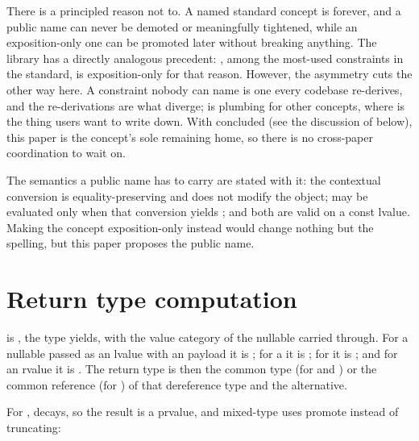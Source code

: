 \documentclass[a4paper,10pt,oneside,openany,final,article]{memoir}
\begin{document}
There is a principled reason not to. A named standard concept is forever, and
a public name can never be demoted or meaningfully tightened, while an
exposition-only one can be promoted later without breaking anything. The
library has a directly analogous precedent: ,
among the most-used constraints in the standard, is exposition-only for that
reason. However, the asymmetry cuts the other way here. A
constraint nobody can name is one every codebase re-derives, and the
re-derivations are what diverge;  is
plumbing for other concepts, where  is the thing users want
to write down. With \cite{P1255R13} concluded (see the discussion of
 below), this paper is the concept's sole remaining home, so
there is no cross-paper coordination to wait on.

The semantics a public name has to carry are stated with it: the contextual
conversion is equality-preserving and does not modify the object; 
may be evaluated only when that conversion yields ; and both
are valid on a const lvalue. Making the concept exposition-only instead would
change nothing but the spelling, but this paper proposes the public name.

\section{Return type computation}

 is , the type
 yields, with the value category of the nullable carried through.
For a nullable passed as an lvalue with an  payload it is
; for a  it is ; for  it is ; and for an
rvalue  it is . The return type is then the common type
(for  and ) or the common reference (for
) of that dereference type and the alternative.

For ,  decays, so the result is a
prvalue, and mixed-type uses promote instead of truncating:
\end{document}
